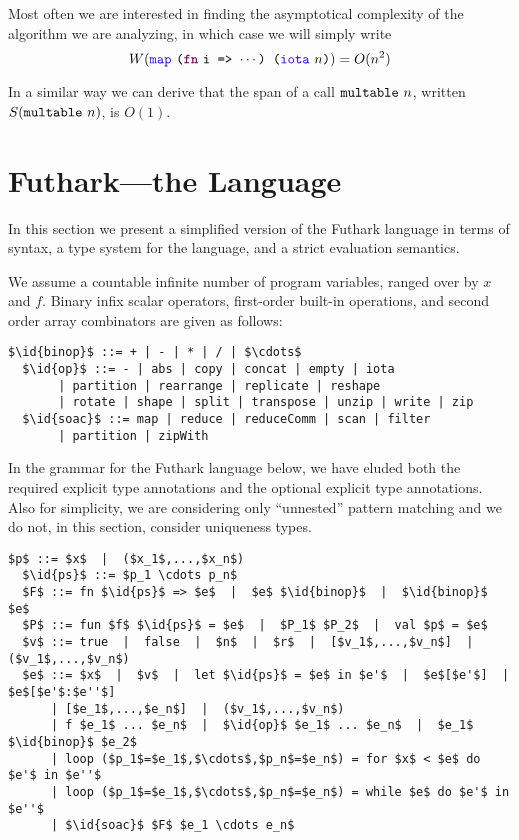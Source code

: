 \documentclass[oneside,11pt]{book}
\begin{document}
\noindent
Most often we are interested in finding the asymptotical complexity of
the algorithm we are analyzing, in which case we will simply write
$$W(\fop{map}~\kw{(}\fw{fn}~\kw{i => $\cdots$) (}\fop{iota}~\kw{$n$)}) = O(n^2) $$

In a similar way we can derive that the span of a call
$\texttt{multable}~n$, written $S(\texttt{multable}~n)$, is $O(1)$.


\section{Futhark---the Language}

In this section we present a simplified version of the Futhark
language in terms of syntax, a type system for the language, and a
strict evaluation semantics.

We assume a countable infinite number of program variables, ranged over
by $x$ and $f$. Binary infix scalar operators, first-order built-in operations, and
second order array combinators are given as follows:

\begin{lstlisting}[mathescape=true]
  $\id{binop}$ ::= + | - | * | / | $\cdots$
  $\id{op}$ ::= - | abs | copy | concat | empty | iota
       | partition | rearrange | replicate | reshape
       | rotate | shape | split | transpose | unzip | write | zip
  $\id{soac}$ ::= map | reduce | reduceComm | scan | filter
       | partition | zipWith
\end{lstlisting}

In the grammar for the Futhark language below, we have eluded both the
required explicit type annotations and the optional explicit type
annotations. Also for simplicity, we are considering only ``unnested''
pattern matching and we do not, in this section, consider uniqueness types.

\begin{lstlisting}[mathescape=true]
  $p$ ::= $x$  |  ($x_1$,...,$x_n$)
  $\id{ps}$ ::= $p_1 \cdots p_n$
  $F$ ::= fn $\id{ps}$ => $e$  |  $e$ $\id{binop}$  |  $\id{binop}$ $e$
  $P$ ::= fun $f$ $\id{ps}$ = $e$  |  $P_1$ $P_2$  |  val $p$ = $e$
  $v$ ::= true  |  false  |  $n$  |  $r$  |  [$v_1$,...,$v_n$]  |  ($v_1$,...,$v_n$)
  $e$ ::= $x$  |  $v$  |  let $\id{ps}$ = $e$ in $e'$  |  $e$[$e'$]  |  $e$[$e'$:$e''$]
      | [$e_1$,...,$e_n$]  |  ($v_1$,...,$v_n$)
      | f $e_1$ ... $e_n$  |  $\id{op}$ $e_1$ ... $e_n$  |  $e_1$ $\id{binop}$ $e_2$
      | loop ($p_1$=$e_1$,$\cdots$,$p_n$=$e_n$) = for $x$ < $e$ do $e'$ in $e''$
      | loop ($p_1$=$e_1$,$\cdots$,$p_n$=$e_n$) = while $e$ do $e'$ in $e''$
      | $\id{soac}$ $F$ $e_1 \cdots e_n$
\end{lstlisting}
\end{document}

